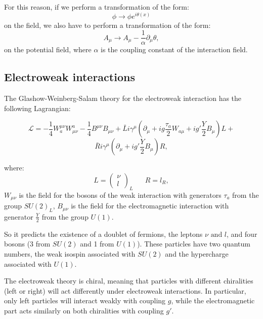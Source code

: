 For this reason, if we perform a transformation of the form:
\begin{equation}
    \phi \rightarrow \phi e^{i\theta(x)}
\end{equation}
on the field, we also have to perform a transformation of the form:
\begin{equation}
    A_{\mu} \rightarrow A_{\mu} -\frac{1}{\alpha}\partial_{\mu}\theta, 
\end{equation}
on the potential field, where $\alpha$ is the coupling constant of the interaction field.\\


\subsection{Electroweak interactions}

The Glashow-Weinberg-Salam theory for the electroweak interaction has the following Lagrangian:

\begin{equation}
    \mathcal{L} = - \frac{1}{4}W_a^{\mu\nu} W_{\mu\nu}^a - \frac{1}{4} B^{\mu\nu}B_{\mu\nu} + \bar{L} i\gamma^{\mu}(\partial_{\mu} + i g \frac{\tau_a}{2}W_{a\mu} + i g' \frac{Y}{2}B_{\mu})L +
    \label{ew_eq}
\end{equation}
\begin{equation*}
    \bar{R} i\gamma^{\mu}(\partial_{\mu} + i g' \frac{Y}{2}B_{\mu})R,
\end{equation*}

where:
\begin{equation}
    L = \begin{pmatrix}
        \nu \\ l
    \end{pmatrix}_L \hspace{20pt} R = l_R,
\end{equation}
$W_{\mu\nu}$ is the field for the bosons of the weak interaction with generators $\tau_a$ from the group $SU(2)_L$, $B_{\mu\nu}$ is the field for the electromagnetic interaction with generator $\frac{Y}{2}$ from the group $U(1)$.

So it predicts the existence of a doublet of fermions, the leptons $\nu \text{ and } l $, and four bosons (3 from  $SU(2)$ and 1 from $U(1)$).
These particles have two quantum numbers, the weak isospin associated with $SU(2)$ and the hypercharge associated with $U(1)$.

The electroweak theory is chiral, meaning that particles with different chiralities (left or right) will act differently under electroweak interactions. 
In particular, only left particles will interact weakly with coupling $g$, while the electromagnetic part acts similarly on both chiralities with coupling $g'$.

